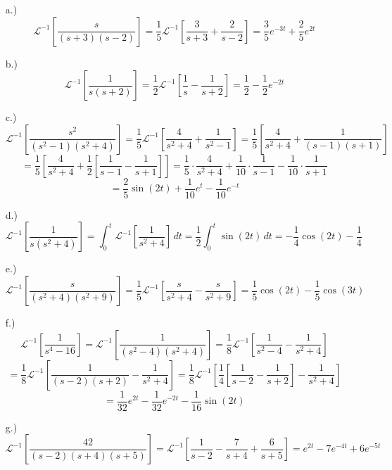 \documentclass[12pt]{article}
\newcommand{\bracks}[1]{\left[#1\right]}
\newcommand{\lpi}{\mathcal{L}^{-1}}
\begin{document}
\pagestyle{fancy}
\fancyhead{}

\normalsize
\begin{itemize}
    \item [a.)] \[\lpi\bracks{\frac{s}{(s+3)(s-2)}}=\frac{1}{5}\lpi\bracks{\frac{3}{s+3}+\frac{2}{s-2}}=\frac{3}{5}e^{-3t}+\frac{2}{5}e^{2t}\]

    \item [b.)] \[\lpi\bracks{\frac{1}{s(s+2)}}=\frac{1}{2}\lpi\bracks{\frac{1}{s}-\frac{1}{s+2}}=\frac{1}{2}-\frac{1}{2}e^{-2t}\]

    \item [c.)] \[\lpi\bracks{\frac{s^2}{(s^2-1)(s^2+4)}}=\frac{1}{5}\lpi\bracks{\frac{4}{s^2+4}+\frac{1}{s^2-1}}=\frac{1}{5}\bracks{\frac{4}{s^2+4}+\frac{1}{(s-1)(s+1)}}\]
    \[=\frac{1}{5}\bracks{\frac{4}{s^2+4}+\frac{1}{2}\bracks{\frac{1}{s-1}-\frac{1}{s+1}}}=\frac{1}{5}\cdot\frac{4}{s^2+4}+\frac{1}{10}\cdot\frac{1}{s-1}-\frac{1}{10}\cdot\frac{1}{s+1}\]
    \[=\frac{2}{5}\sin(2t)+\frac{1}{10}e^t-\frac{1}{10}e^{-t}\]

    \item [d.)] \[\lpi\bracks{\frac{1}{s(s^2+4)}}=\int^t_0\lpi\bracks{\frac{1}{s^2+4}}\,dt=\frac{1}{2}\int^t_0\sin(2t)\,dt=-\frac{1}{4}\cos(2t)-\frac{1}{4}\]

    \item [e.)] \[\lpi\bracks{\frac{s}{(s^2+4)(s^2+9)}}=\frac{1}{5}\lpi\bracks{\frac{s}{s^2+4}-\frac{s}{s^2+9}}=\frac{1}{5}\cos(2t)-\frac{1}{5}\cos(3t)\]

    \item [f.)] \[\lpi\bracks{\frac{1}{s^4-16}}=\lpi\bracks{\frac{1}{(s^2-4)(s^2+4)}}=\frac{1}{8}\lpi\bracks{\frac{1}{s^2-4}-\frac{1}{s^2+4}}\]
    \[=\frac{1}{8}\lpi\bracks{\frac{1}{(s-2)(s+2)}-\frac{1}{s^2+4}}=\frac{1}{8}\lpi\bracks{\frac{1}{4}\bracks{\frac{1}{s-2}-\frac{1}{s+2}}-\frac{1}{s^2+4}}\]
    \[=\frac{1}{32}e^{2t}-\frac{1}{32}e^{-2t}-\frac{1}{16}\sin(2t)\]

    \item [g.)] \[\lpi\bracks{\frac{42}{(s-2)(s+4)(s+5)}}=\lpi\bracks{\frac{1}{s-2}-\frac{7}{s+4}+\frac{6}{s+5}}=e^{2t}-7e^{-4t}+6e^{-5t}\]
\end{itemize}
\end{document}
